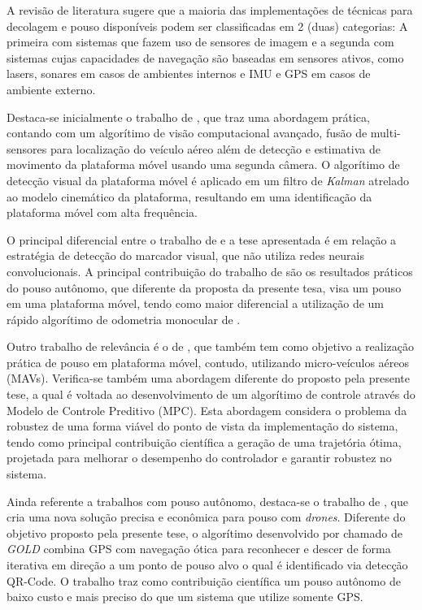     A revisão de literatura sugere que a maioria das implementações de técnicas para decolagem e pouso disponíveis podem ser classificadas em 2 (duas) categorias: A primeira com sistemas que fazem uso de sensores de imagem e a segunda com sistemas cujas capacidades de navegação são baseadas em sensores ativos, como lasers, sonares em casos de ambientes internos e IMU e GPS em casos de ambiente externo.
    
    Destaca-se inicialmente o trabalho de \citet{Falanga2017}, que traz uma abordagem prática, contando com um algorítimo de visão computacional avançado, fusão de multi-sensores para localização do veículo aéreo além de detecção e estimativa de movimento da plataforma móvel usando uma segunda câmera. O algorítimo de detecção visual da plataforma móvel é aplicado em um filtro de \textit{Kalman} atrelado ao modelo cinemático da plataforma, resultando em uma identificação da plataforma móvel com alta frequência.
    
    O principal diferencial entre o trabalho de \citet{Falanga2017} e a tese apresentada é em relação a estratégia de detecção do marcador visual, que não utiliza redes neurais convolucionais. A principal contribuição do trabalho de \citet{Falanga2017} são os resultados práticos do pouso autônomo, que diferente da proposta da presente tesa, visa um pouso em uma plataforma móvel, tendo como maior diferencial a utilização de um rápido algorítimo de odometria monocular de \cite{Forster2014}.
    
    Outro trabalho de relevância é o de \citet{Gilberto2016}, que também tem como objetivo a realização prática de pouso em plataforma móvel, contudo, utilizando micro-veículos aéreos (MAVs). Verifica-se também uma abordagem diferente do proposto pela presente tese, a qual é voltada ao desenvolvimento de um algorítimo de controle através do Modelo de Controle Preditivo (MPC). Esta abordagem considera o problema da robustez de uma forma viável do ponto de vista da implementação do sistema, tendo como principal contribuição científica a geração de uma trajetória ótima, projetada para melhorar o desempenho do controlador e garantir robustez no sistema.
    
    Ainda referente a trabalhos com pouso autônomo, destaca-se o trabalho de \citet{Maiman2017}, que cria uma nova solução precisa e econômica para pouso com \textit{drones}. Diferente do objetivo proposto pela presente tese, o algorítimo desenvolvido por \citet{Maiman2017} chamado de \textit{GOLD} combina GPS com navegação ótica para reconhecer e descer de forma iterativa em direção a um ponto de pouso alvo o qual é identificado via detecção QR-Code. O trabalho traz como contribuição científica um pouso autônomo de baixo custo e mais preciso do que um sistema que utilize somente GPS.
    
